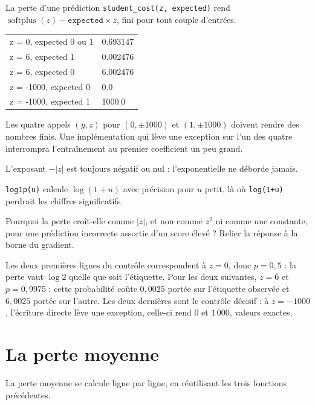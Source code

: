 \begin{tache}{La perte d'une prédiction}
 \texttt{student\_cost(z, expected)} rend
$\operatorname{softplus}(z)-\texttt{expected}\times z$, fini pour tout couple
d'entrées.

\begin{center}\ttfamily\footnotesize
\begin{tabular}{@{}ll@{}}
z = 0, expected 0 ou 1 & 0.693147\\
z = 6, expected 1 & 0.002476\\
z = 6, expected 0 & 6.002476\\
z = -1000, expected 0 & 0.0\\
z = -1000, expected 1 & 1000.0\\
\end{tabular}
\end{center}
Les quatre appels $(y,z)$ pour $(0,\pm1000)$ et $(1,\pm1000)$ doivent rendre des
nombres finis. Une implémentation qui lève une exception sur l'un des quatre
interrompra l'entraînement au premier coefficient un peu grand.

 L'exposant $-|z|$ est toujours négatif ou nul : l'exponentielle
ne déborde jamais.

 \texttt{log1p(u)} calcule $\log(1+u)$ avec précision pour $u$
petit, là où \texttt{log(1+u)} perdrait les chiffres significatifs.

 Pourquoi la perte croît-elle comme $|z|$, et non comme $z^2$ ni
comme une constante, pour une prédiction incorrecte assortie d'un score élevé ?
Relier la réponse à la borne du gradient.
\end{tache}

Les deux premières lignes du contrôle correspondent à $z=0$, donc $p=0{,}5$ : la
perte vaut $\log 2$ quelle que soit l'étiquette. Pour les deux suivantes, $z=6$
et $p=0{,}9975$ : cette probabilité coûte $0{,}0025$ portée sur l'étiquette
observée et $6{,}0025$ portée sur l'autre. Les deux dernières sont le contrôle
décisif : à $z=-1000$, l'écriture directe lève une exception, celle-ci rend $0$
et $1\,000$, valeurs exactes.

\section{La perte moyenne}

La perte moyenne se calcule ligne par ligne, en réutilisant les trois fonctions
précédentes.

